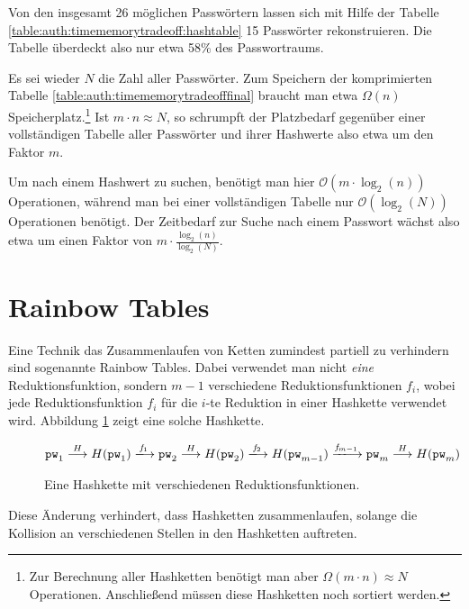 Von den insgesamt 26 möglichen Passwörtern lassen sich mit Hilfe der
Tabelle \ref{table:auth:timememorytradeoff:hashtable} 15 Passwörter
rekonstruieren. Die Tabelle überdeckt also nur etwa 58\% des
Passwortraums.

Es sei wieder $N$ die Zahl aller Passwörter. Zum Speichern der
komprimierten Tabelle \ref{table:auth:timememorytradeofffinal} braucht
man etwa $\Omega(n)$ Speicherplatz.\footnote{Zur Berechnung aller
Hashketten benötigt man aber $\Omega(m \cdot n) \approx N$
Operationen. Anschließend müssen diese Hashketten noch sortiert werden.}
Ist $m \cdot n \approx N$, so schrumpft der Platzbedarf gegenüber einer
vollständigen Tabelle aller Passwörter und ihrer Hashwerte also etwa um
den Faktor $m$.

Um nach einem Hashwert zu suchen, benötigt man hier $\mathcal{O}(m \cdot
\log_2(n))$ Operationen, während man bei einer vollständigen Tabelle nur
$\mathcal{O}(\log_2(N))$ Operationen benötigt. Der Zeitbedarf zur Suche
nach einem Passwort wächst also etwa um einen Faktor von $m \cdot
\frac{\log_2(n)}{\log_2(N)}$.

\section{Rainbow Tables}

Eine Technik das Zusammenlaufen von Ketten zumindest partiell zu
verhindern sind sogenannte Rainbow Tables. Dabei verwendet man nicht
\emph{eine} Reduktionsfunktion, sondern $m-1$ verschiedene
Reduktionsfunktionen $f_i$, wobei jede Reduktionsfunktion $f_i$ für die
$i$-te Reduktion in einer Hashkette verwendet wird. Abbildung
\ref{fig:auth:rainbowhashchain} zeigt eine solche Hashkette.

\begin{figure}[h!]
	\begin{equation*} \pw_1 \hasharrow H(\pw_1) \VRTF[1] \pw_2
\hasharrow H(\pw_2) \VRTF[2] %
H(\pw_{m-1}) \VRTF[m-1] \pw_m \hasharrow H(\pw_m)
	\end{equation*}
	\caption{Eine Hashkette mit verschiedenen Reduktionsfunktionen.}
	\label{fig:auth:rainbowhashchain}
\end{figure}

Diese Änderung verhindert, dass Hashketten zusammenlaufen, solange die
Kollision an verschiedenen Stellen in den Hashketten auftreten.

